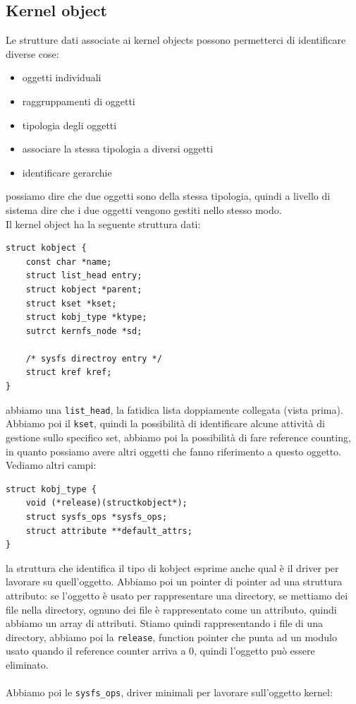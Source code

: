 \documentclass[12pt, oneside]{extbook}
\begin{document}
\subsection{Kernel object}
Le strutture dati associate ai kernel objects possono permetterci di identificare diverse cose:
\begin{itemize}
	\item oggetti individuali
	\item raggruppamenti di oggetti
	\item tipologia degli oggetti
	\item associare la stessa tipologia a diversi oggetti
	\item identificare gerarchie
\end{itemize}
possiamo dire che due oggetti sono della stessa tipologia, quindi a livello di sistema dire che i due oggetti vengono gestiti nello stesso modo.\\Il kernel object ha la seguente struttura dati:
\begin{lstlisting}
struct kobject {
	const char *name;
	struct list_head entry;
	struct kobject *parent;
	struct kset *kset;
	struct kobj_type *ktype;
	sutrct kernfs_node *sd;
	
	/* sysfs directroy entry */
	struct kref kref;
}
\end{lstlisting}
abbiamo una \texttt{list\_head}, la fatidica lista doppiamente collegata (vista prima). Abbiamo poi il \texttt{kset}, quindi la possibilità di identificare alcune attività di gestione sullo specifico set, abbiamo poi la possibilità di fare reference counting, in quanto possiamo avere altri oggetti che fanno riferimento a questo oggetto.\\Vediamo altri campi:
\begin{lstlisting}
struct kobj_type {
	void (*release)(structkobject*);
	struct sysfs_ops *sysfs_ops;
	struct attribute **default_attrs;
}
\end{lstlisting}
la struttura che identifica il tipo di kobject esprime anche qual è il driver per lavorare su quell'oggetto. Abbiamo poi un pointer di pointer ad una struttura attributo: se l'oggetto è usato per rappresentare una directory, se mettiamo dei file nella directory, ognuno dei file è rappresentato come un attributo, quindi abbiamo un array di attributi. Stiamo quindi rappresentando i file di una directory, abbiamo poi la \texttt{release}, function pointer che punta ad un modulo usato quando il reference counter arriva a 0, quindi l'oggetto può essere eliminato.\\\\Abbiamo poi le \texttt{sysfs\_ops}, driver minimali per lavorare sull'oggetto kernel:
\end{document}
